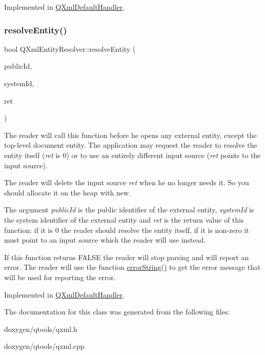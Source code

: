 Implemented in \mbox{\hyperlink{class_q_xml_default_handler_afcbe5fdce86cea4b7863e752c2413c45}{Q\+Xml\+Default\+Handler}}.

\mbox{\label{class_q_xml_entity_resolver_a4b0b6141c016eb3f7e37361f4ce13966}} 
\subsubsection{\texorpdfstring{resolveEntity()}{resolveEntity()}}
{\footnotesize\ttfamily bool Q\+Xml\+Entity\+Resolver\+::resolve\+Entity (\begin{DoxyParamCaption}\item[{const \mbox{\hyperlink{class_q_string}{Q\+String}} \&}]{public\+Id,  }\item[{const \mbox{\hyperlink{class_q_string}{Q\+String}} \&}]{system\+Id,  }\item[{\mbox{\hyperlink{class_q_xml_input_source}{Q\+Xml\+Input\+Source}} $\ast$\&}]{ret }\end{DoxyParamCaption})\hspace{0.3cm}{\ttfamily [pure virtual]}}

The reader will call this function before he opens any external entity, except the top-\/level document entity. The application may request the reader to resolve the entity itself ({\itshape ret} is 0) or to use an entirely different input source ({\itshape ret} points to the input source).

The reader will delete the input source {\itshape ret} when he no longer needs it. So you should allocate it on the heap with {\ttfamily new}.

The argument {\itshape public\+Id} is the public identifier of the external entity, {\itshape system\+Id} is the system identifier of the external entity and {\itshape ret} is the return value of this function\+: if it is 0 the reader should resolve the entity itself, if it is non-\/zero it must point to an input source which the reader will use instead.

If this function returns F\+A\+L\+SE the reader will stop parsing and will report an error. The reader will use the function \mbox{\hyperlink{class_q_xml_entity_resolver_a3f190a7cd80a8faa3df903f963709370}{error\+String()}} to get the error message that will be used for reporting the error. 

Implemented in \mbox{\hyperlink{class_q_xml_default_handler_ac2fa1a7aff599d2832fca1d650a435a7}{Q\+Xml\+Default\+Handler}}.



The documentation for this class was generated from the following files\+:\begin{DoxyCompactItemize}
\item 
doxygen/qtools/qxml.\+h\item 
doxygen/qtools/qxml.\+cpp\end{DoxyCompactItemize}
